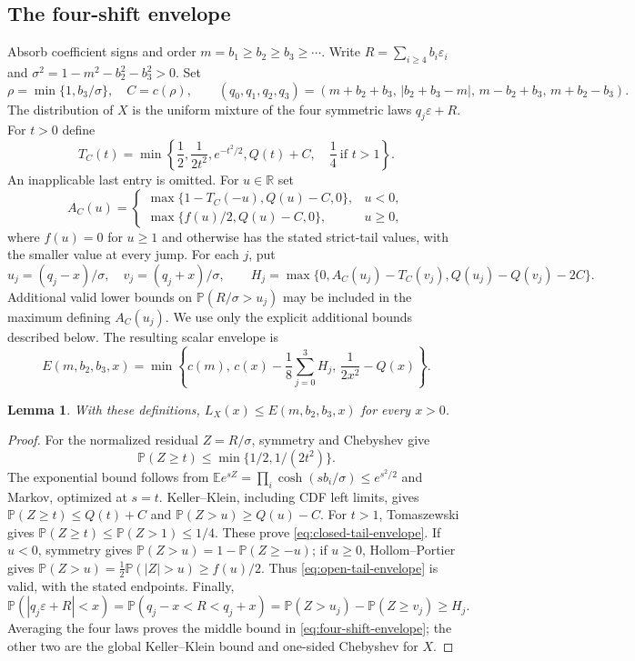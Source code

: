 \documentclass[11pt]{article}
\newtheorem{lemma}[theorem]{Lemma}
\theoremstyle{remark}\newtheorem{remark}[theorem]{Remark}
\newcommand{\Pp}{\mathbb P}
\newcommand{\E}{\mathbb E}
\begin{document}
\subsection{The four-shift envelope}
Absorb coefficient signs and order $m=b_1\ge b_2\ge b_3\ge\cdots$.
Write $R=\sum_{i\ge4}b_i\varepsilon_i$ and
$\sigma^2=1-m^2-b_2^2-b_3^2>0$. Set
\[
 \rho=\min\{1,b_3/\sigma\},\quad C=c(\rho),\qquad
 (q_0,q_1,q_2,q_3)
 =(m+b_2+b_3,\,|b_2+b_3-m|,\,m-b_2+b_3,\,m+b_2-b_3).
\]
The distribution of $X$ is the uniform mixture of the four symmetric
laws $q_j\varepsilon+R$. For $t>0$ define
\begin{equation}\label{eq:closed-tail-envelope}
 T_C(t)=\min\left\{\frac12,\frac1{2t^2},e^{-t^2/2},Q(t)+C,
 \quad\frac14\ \text{if }t>1\right\}.
\end{equation}
An inapplicable last entry is omitted. For $u\in\mathbb R$ set
\begin{equation}\label{eq:open-tail-envelope}
 A_C(u)=
 \begin{cases}
 \max\{1-T_C(-u),Q(u)-C,0\},&u<0,\\
 \max\{f(u)/2,Q(u)-C,0\},&u\ge0,
 \end{cases}
\end{equation}
where $f(u)=0$ for $u\ge1$ and otherwise has the stated strict-tail
values, with the smaller value at every jump. For each $j$, put
\[
 u_j=(q_j-x)/\sigma,\quad v_j=(q_j+x)/\sigma,
 \qquad
 H_j=\max\{0,A_C(u_j)-T_C(v_j),Q(u_j)-Q(v_j)-2C\}.
\]
Additional valid lower bounds on $\Pp(R/\sigma>u_j)$ may be included
in the maximum defining $A_C(u_j)$. We use only the explicit
additional bounds described below. The resulting scalar envelope is
\begin{equation}\label{eq:four-shift-envelope}
 E(m,b_2,b_3,x)=\min\left\{c(m),\,
 c(x)-\frac18\sum_{j=0}^3H_j,\,
 \frac1{2x^2}-Q(x)\right\}.
\end{equation}

\begin{lemma}\label{lem:four-shift-valid}
With these definitions, $L_X(x)\le E(m,b_2,b_3,x)$ for every $x>0$.
\end{lemma}
\begin{proof}
For the normalized residual $Z=R/\sigma$, symmetry and Chebyshev give
\[
 \Pp(Z\ge t)\le\min\{1/2,1/(2t^2)\}.
\]
The exponential bound follows
from $\E e^{sZ}=\prod_i\cosh(sb_i/\sigma)\le e^{s^2/2}$ and Markov,
optimized at $s=t$. Keller--Klein, including CDF left limits, gives
$\Pp(Z\ge t)\le Q(t)+C$ and $\Pp(Z>u)\ge Q(u)-C$.
For $t>1$, Tomaszewski gives
$\Pp(Z\ge t)\le\Pp(Z>1)\le1/4$. These prove
\eqref{eq:closed-tail-envelope}. If $u<0$, symmetry gives
$\Pp(Z>u)=1-\Pp(Z\ge-u)$; if $u\ge0$, Hollom--Portier gives
$\Pp(Z>u)=\frac12\Pp(|Z|>u)\ge f(u)/2$.
Thus \eqref{eq:open-tail-envelope} is valid, with the stated endpoints.
Finally,
\[
 \Pp(|q_j\varepsilon+R|<x)
 =\Pp(q_j-x<R<q_j+x)
 =\Pp(Z>u_j)-\Pp(Z\ge v_j)\ge H_j.
\]
Averaging the four laws proves the middle bound in
\eqref{eq:four-shift-envelope}; the other two are the global
Keller--Klein bound and one-sided Chebyshev for $X$.
\end{proof}
\end{document}

